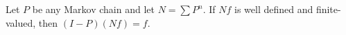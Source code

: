 Let $P$ be any Markov chain and let $N = \sum P^n$. If $Nf$ is well defined and finite-valued, then $(I - P)(Nf) = f$.
